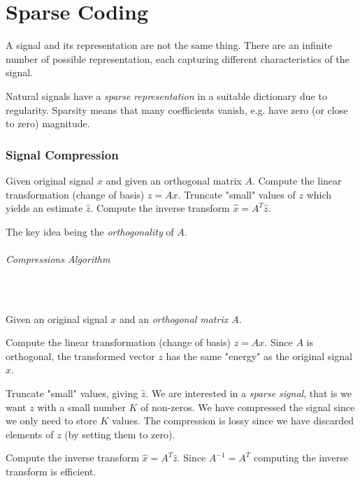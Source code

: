 \newpage
\part{Sparse Coding}
A signal and its representation are not the same thing. There are an infinite number of possible representation, each capturing different  characteristics of the signal. 

Natural signals have a \emph{sparse representation} in a suitable dictionary due to regularity. Sparsity means that many coefficients vanish, e.g. have zero (or close to zero)  magnitude.
\section{Signal Compression}
Given original signal $x$ and given an orthogonal matrix $A$. Compute the linear transformation (change of basis) $z=Ax$. Truncate "small" values of $z$ which yields an estimate $\hat z$. Compute the inverse transform $\hat x = A^T \hat z$.


The key idea being the \emph{orthogonality} of $A$.

\paragraph{Compressions Algorithm} $\ $
\begin{description}
\item Given an original signal $x$ and an \emph{orthogonal matrix $A$}.
\item Compute the linear transformation (change of basis) $z=Ax$. 
    \subitem Since $A$ is orthogonal, the transformed vector $z$ has the same "energy" as the original signal $x$.
\item Truncate "small" values, giving $\hat z$.
    \subitem We are interested in a \emph{sparse signal}, that is we want $z$ with a small number $K$ of non-zeros.
    \subitem We have compressed the signal since we only need to store $K$ values.
    \subitem The compression is lossy since we have discarded elements of $z$ (by setting them to zero).
\item Compute the inverse transform $\hat x = A^T \hat z$.
    \subitem Since $A^{-1} = A^T$ computing the inverse transform is efficient.
\end{description}

